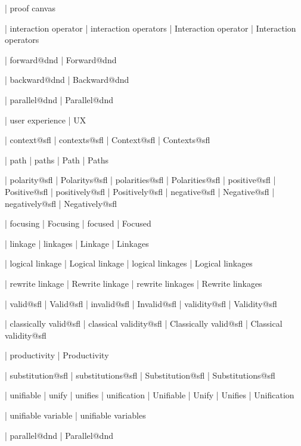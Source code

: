  | proof canvas

 | interaction operator
 | interaction operators
 | Interaction operator
 | Interaction operators

 | forward@dnd
 | Forward@dnd

 | backward@dnd
 | Backward@dnd

 | parallel@dnd
 | Parallel@dnd


 | user experience
 | UX
 
 | context@sfl
 | contexts@sfl
 | Context@sfl
 | Contexts@sfl

 | path
 | paths
 | Path
 | Paths

 | polarity@sfl
 | Polaritys@sfl
 | polarities@sfl
 | Polarities@sfl
 | positive@sfl
 | Positive@sfl
 | positively@sfl
 | Positively@sfl
 | negative@sfl
 | Negative@sfl
 | negatively@sfl
 | Negatively@sfl

 | focusing
 | Focusing
 | focused
 | Focused

 | linkage
 | linkages
 | Linkage
 | Linkages

 | logical linkage
 | Logical linkage
 | logical linkages
 | Logical linkages

 | rewrite linkage
 | Rewrite linkage
 | rewrite linkages
 | Rewrite linkages

 | valid@sfl
 | Valid@sfl
 | invalid@sfl
 | Invalid@sfl
 | validity@sfl
 | Validity@sfl

 | classically valid@sfl
 | classical validity@sfl
 | Classically valid@sfl
 | Classical validity@sfl

 | productivity
 | Productivity
 
 | substitution@sfl
 | substitutions@sfl
 | Substitution@sfl
 | Substitutions@sfl

 | unifiable
 | unify
 | unifies
 | unification
 | Unifiable
 | Unify
 | Unifies
 | Unification

 | unifiable variable
 | unifiable variables

 | parallel@dnd
 | Parallel@dnd

